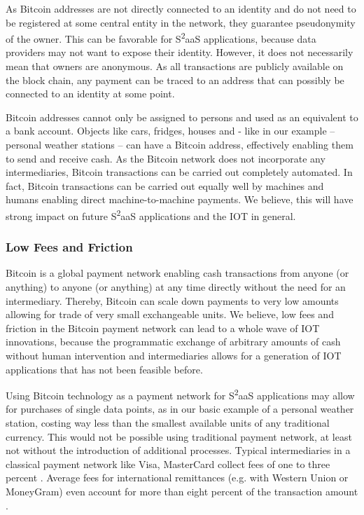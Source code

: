 As Bitcoin addresses are not directly connected to an identity and do not need to be registered at some central entity in the network, they guarantee pseudonymity of the owner. This can be favorable for S\textsuperscript{2}aaS applications, because data providers may not want to expose their identity. However, it does not necessarily mean that owners are anonymous. As all transactions are publicly available on the block chain, any payment can be traced to an address that can possibly be connected to an identity at some point.

Bitcoin addresses cannot only be assigned to persons and used as an equivalent to a bank account. Objects like cars, fridges, houses and - like in our example -- personal weather stations -- can have a Bitcoin address, effectively enabling them to send and receive cash. As the Bitcoin network does not incorporate any intermediaries, Bitcoin transactions can be carried out completely automated. In fact, Bitcoin transactions can be carried out equally well by machines and humans enabling direct machine-to-machine payments. We believe, this will have strong impact on future S\textsuperscript{2}aaS applications and the IOT in general.

\subsubsection{Low Fees and Friction}

Bitcoin is a global payment network enabling cash transactions from anyone (or anything) to anyone (or anything) at any time directly without the need for an intermediary. Thereby, Bitcoin can scale down payments to very low amounts allowing for trade of very small exchangeable units. We believe, low fees and friction in the Bitcoin payment network can lead to a whole wave of IOT innovations, because the programmatic exchange of arbitrary amounts of cash without human intervention and intermediaries allows for a generation of IOT applications that has not been feasible before.

Using Bitcoin technology as a payment network for S\textsuperscript{2}aaS applications may allow for purchases of single data points, as in our basic example of a personal weather station, costing way less than the smallest available units of any traditional currency. This would not be possible using traditional payment network, at least not without the introduction of additional processes. Typical intermediaries in a classical payment network like Visa, MasterCard collect fees of one to three percent \cite{chakravorti2003theory}. Average fees for international remittances (e.g. with Western Union or MoneyGram) even account for more than eight percent of the transaction amount \cite{remittances}.

